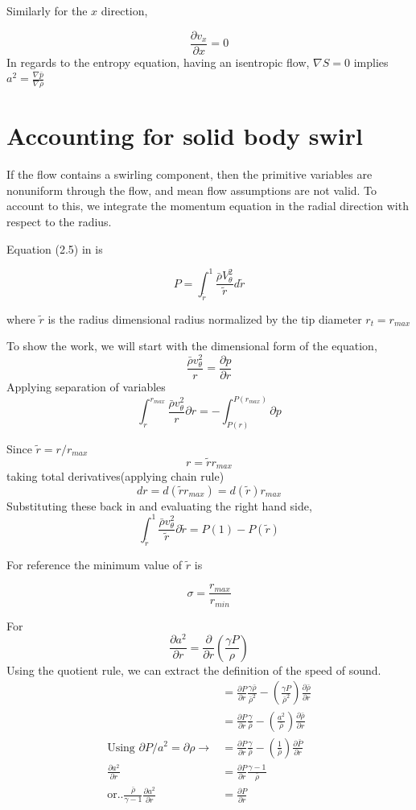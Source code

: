 \documentclass[12pt]{article}
\begin{document}
Similarly for the $x$ direction,

\[ \frac{\partial v_x}{\partial x} = 0 \]
In regards to the entropy equation, having an isentropic flow, $\nabla S = 0$ implies $a^2= \frac{\nabla \bar{p}}{ \nabla \bar{\rho}}$ 

\section{Accounting for solid body swirl}

If the flow contains a swirling component, then the primitive variables are nonuniform through the flow, and mean flow assumptions are not valid. To account to this, we integrate the momentum equation in the radial direction with respect to the radius. 

Equation (2.5) in \cite{Kousen1999} is 

\[P = \int_{\tilde{r}}^{1} \frac{\bar{\rho} V_{\theta}^2}{\tilde{r}} d\tilde{r}\] 

where $\tilde{r}$ is the radius dimensional radius normalized by the tip diameter $r_t = r_{max}$

To show the work, we will start with the dimensional form of the equation,
\[
\frac{\bar{\rho} v_{\theta}^2}{r} 
=\frac{\partial p}{\partial r}
\]
Applying separation of variables
\[
\int_{r}^{r_{max}} \frac{\bar{\rho} v_{\theta}^2}{r}\partial r 
=-\int_{P(r)}^{P(r_{max})}\partial p
\]

Since $\tilde{r} = r/r_{max}$
\[r = \tilde{r}r_{max}\]
taking total derivatives(applying chain rule)
\[dr = d(\tilde{r}r_{max}) = d(\tilde{r})r_{max}\]
Substituting these back in and evaluating the right hand side,
\[
\int_{\tilde{r}}^{1} \frac{\bar{\rho} v_{\theta}^2}{\tilde{r}}\partial \tilde{r} 
=P(1)-P(\tilde{r})
\]

For reference the minimum value of $\tilde{r}$ is

\[\sigma = \frac{r_{max}}{r_{min}}\]

For 
\[\frac{\partial a^2}{\partial r } = \frac{\partial}{\partial r} \left( \frac{\gamma P}{\rho} \right)\]
Using the quotient rule, we can extract the definition of the speed of sound.
\begin{align*}
&= \frac{\partial P}{\partial r} \frac{\gamma \bar{\rho}}{\bar{\rho}^2} - \left( \frac{\gamma P}{\bar{\rho}^2} \right) \frac{\partial \bar{\rho}}{\partial r}\\
&=  \frac{\partial P}{\partial r} \frac{\gamma }{\bar{\rho}} - \left( \frac{a^2}{\bar{\rho}} \right) \frac{\partial \bar{\rho} }{\partial r}\\ \text{Using } \partial P/a^2 = \partial \rho \rightarrow &= \frac{\partial P}{\partial r} \frac{\gamma }{\bar{\rho}} - \left( \frac{1}{\bar{\rho}} \right) \frac{\partial \bar{ P} }{\partial r}\\
\frac{\partial a^2}{\partial r} &= \frac{\partial P}{\partial r} \frac{\gamma - 1}{\bar{\rho}}  \\ \text{or..}
\frac{\bar{\rho}}{\gamma -1}\frac{\partial a^2}{\partial r} &= \frac{\partial P}{\partial r} 
\end{align*}
\end{document}
